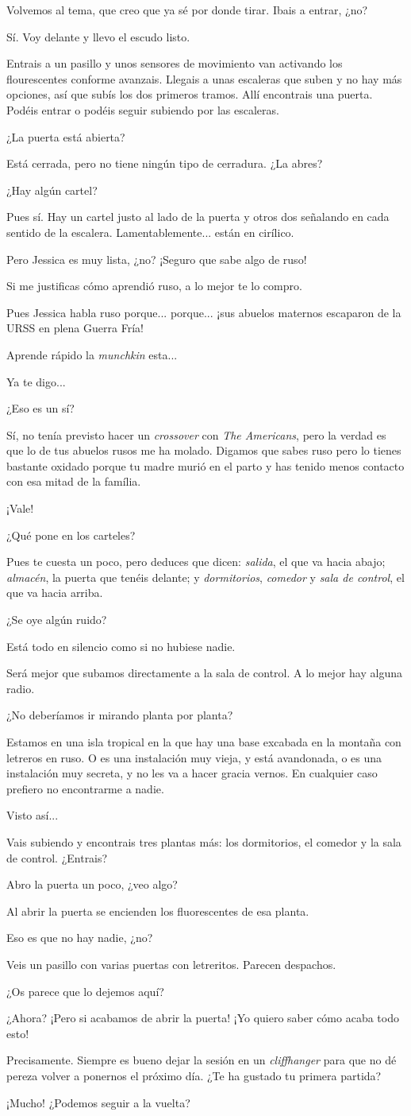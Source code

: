 \documentclass[10pt, a5paper, twocolumn]{article}
\newenvironment{dialogue}
    {\begin{description}[leftmargin=!,align=right,labelwidth=0.cm]}
    {\end{description}}
\newcommand\A{\item[\raisebox{-0.25em}{\scalebox{0.75}{\bctetraedre}}]}
\newcommand\B{\item[\raisebox{-0.25em}{\scalebox{0.75}{\bccube}}]}
\newcommand\E{\item[\raisebox{-0.25em}{\scalebox{0.75}{\bcicosaedre}}]}
\begin{document}
    \begin{dialogue}
        \E Volvemos al tema, que creo que ya sé por donde tirar. Ibais a entrar, ¿no?
        \B Sí. Voy delante y llevo el escudo listo.
        \E Entrais a un pasillo y unos sensores de movimiento van activando los flourescentes conforme avanzais. Llegais a unas escaleras que suben y no hay más opciones, así que subís los dos primeros tramos. Allí encontrais una puerta. Podéis entrar o podéis seguir subiendo por las escaleras.
        \B ¿La puerta está abierta?
        \E Está cerrada, pero no tiene ningún tipo de cerradura. ¿La abres?
        \A ¿Hay algún cartel?
        \E Pues sí. Hay un cartel justo al lado de la puerta y otros dos señalando en cada sentido de la escalera. Lamentablemente... están en cirílico.
        \A Pero Jessica es muy lista, ¿no? ¡Seguro que sabe algo de ruso!
        \E Si me justificas cómo aprendió ruso, a lo mejor te lo compro.
        \A Pues Jessica habla ruso porque... porque... ¡sus abuelos maternos escaparon de la URSS en plena Guerra Fría!
        \E Aprende rápido la \emph{munchkin} esta...
        \B Ya te digo...
        \A ¿Eso es un sí?
        \E Sí, no tenía previsto hacer un \emph{crossover} con \emph{The Americans}, pero la verdad es que lo de tus abuelos rusos me ha molado. Digamos que sabes ruso pero lo tienes bastante oxidado porque tu madre murió en el parto y has tenido menos contacto con esa mitad de la família.
        \A ¡Vale!
        \B ¿Qué pone en los carteles?
        \E Pues te cuesta un poco, pero deduces que dicen: \emph{salida}, el que va hacia abajo; \emph{almacén}, la puerta que tenéis delante; y \emph{dormitorios}, \emph{comedor} y \emph{sala de control}, el que va hacia arriba.
        \B ¿Se oye algún ruido?
        \E Está todo en silencio como si no hubiese nadie.
        \B Será mejor que subamos directamente a la sala de control. A lo mejor hay alguna radio.
        \A ¿No deberíamos ir mirando planta por planta?
        \B Estamos en una isla tropical en la que hay una base excabada en la montaña con letreros en ruso. O es una instalación muy vieja, y está avandonada, o es una instalación muy secreta, y no les va a hacer gracia vernos. En cualquier caso prefiero no encontrarme a nadie.
        \A Visto así...
        \E Vais subiendo y encontrais tres plantas más: los dormitorios, el comedor y la sala de control. ¿Entrais?
        \B Abro la puerta un poco, ¿veo algo?
        \E Al abrir la puerta se encienden los fluorescentes de esa planta.
        \A Eso es que no hay nadie, ¿no?
        \E Veis un pasillo con varias puertas con letreritos. Parecen despachos.
        \B
        \newpage
        \E ¿Os parece que lo dejemos aquí?
        \A ¿Ahora? ¡Pero si acabamos de abrir la puerta! ¡Yo quiero saber cómo acaba todo esto!
        \E Precisamente. Siempre es bueno dejar la sesión en un \emph{cliffhanger} para que no dé pereza volver a ponernos el próximo día. ¿Te ha gustado tu primera partida?
        \A ¡Mucho! ¿Podemos seguir a la vuelta?
    \end{dialogue}
\end{document}
